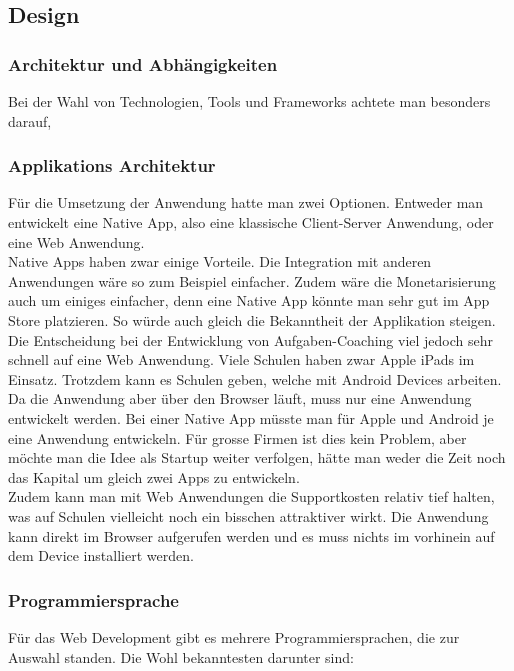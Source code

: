 \subsection{Design}
\subsubsection{Architektur und Abhängigkeiten}
Bei der Wahl von Technologien, Tools und Frameworks achtete man besonders darauf, 
\subsubsection*{Applikations Architektur}
Für die Umsetzung der Anwendung hatte man zwei Optionen. Entweder man entwickelt eine Native App, also eine klassische Client-Server Anwendung, oder eine Web Anwendung. \\

Native Apps haben zwar einige Vorteile. Die Integration mit anderen Anwendungen wäre so zum Beispiel einfacher. Zudem wäre die Monetarisierung 	auch um einiges einfacher, denn eine Native App könnte man sehr gut im App Store platzieren. So würde auch gleich die Bekanntheit der Applikation steigen. \\

Die Entscheidung bei der Entwicklung von Aufgaben-Coaching viel jedoch sehr schnell auf eine Web Anwendung. Viele Schulen haben zwar Apple iPads im Einsatz. Trotzdem kann es Schulen geben, welche mit Android Devices arbeiten. Da die Anwendung aber über den Browser läuft, muss nur eine Anwendung entwickelt werden. Bei einer Native App müsste man für Apple und Android je eine Anwendung entwickeln. Für grosse Firmen ist dies kein Problem, aber möchte man die Idee als Startup weiter verfolgen, hätte man weder die Zeit noch das Kapital um gleich zwei Apps zu entwickeln. \\
Zudem kann man mit Web Anwendungen die Supportkosten relativ tief halten, was auf Schulen vielleicht noch ein bisschen attraktiver wirkt. Die Anwendung kann direkt im Browser aufgerufen werden und es muss nichts im vorhinein auf dem Device installiert werden.


\subsubsection*{Programmiersprache}
Für das Web Development gibt es mehrere Programmiersprachen, die zur Auswahl standen. Die Wohl bekanntesten darunter sind:

